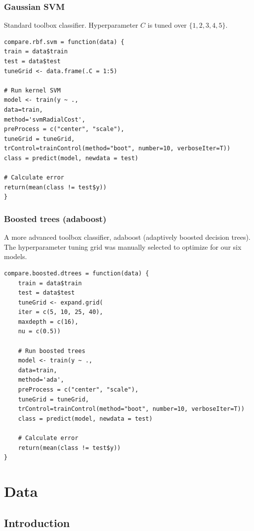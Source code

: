 \documentclass{amsart}
\begin{document}
\subsubsection{Gaussian SVM}

Standard toolbox classifier. Hyperparameter $C$ is tuned over $\{1,2,3,4,5\}$\@.

\begin{lstlisting}[caption=Modular RBF-SVM (via CARET) testing code]
compare.rbf.svm = function(data) {
train = data$train
test = data$test
tuneGrid <- data.frame(.C = 1:5)

# Run kernel SVM
model <- train(y ~ .,
data=train,
method='svmRadialCost',
preProcess = c("center", "scale"),
tuneGrid = tuneGrid,
trControl=trainControl(method="boot", number=10, verboseIter=T))
class = predict(model, newdata = test)

# Calculate error
return(mean(class != test$y))
}
\end{lstlisting}



\subsubsection{Boosted trees (adaboost)}

A more advanced toolbox classifier, adaboost (adaptively boosted decision trees). The hyperparameter tuning grid was manually selected to optimize for our six models.

\begin{lstlisting}[caption=Modular boosted decision trees (via CARET) testing code]
compare.boosted.dtrees = function(data) {
	train = data$train
	test = data$test
	tuneGrid <- expand.grid(
	iter = c(5, 10, 25, 40),
	maxdepth = c(16),
	nu = c(0.5))
	
	# Run boosted trees
	model <- train(y ~ .,
	data=train,
	method='ada',
	preProcess = c("center", "scale"),
	tuneGrid = tuneGrid,
	trControl=trainControl(method="boot", number=10, verboseIter=T))
	class = predict(model, newdata = test)
	
	# Calculate error
	return(mean(class != test$y))
}
\end{lstlisting}




\newpage
\section{Data}\label{sec:data}

\subsection{Introduction}
\end{document}
